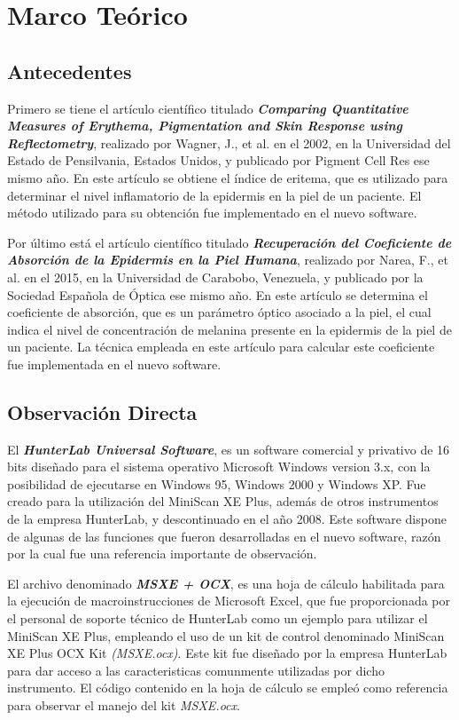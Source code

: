 \chapter{\label{cap:2}Marco Te\'{o}rico}

	\section{Antecedentes}	
			
			Primero se tiene el art\'{i}culo cient\'{i}fico titulado \textbf{\textit{Comparing Quantitative Measures of Erythema, Pigmentation and Skin Response using Reflectometry}}, realizado por Wagner, J., et al. en el 2002, en la Universidad del Estado de Pensilvania, Estados Unidos, y publicado por Pigment Cell Res ese mismo a\~{n}o. En este art\'{i}culo se obtiene el \'{i}ndice de eritema, que es utilizado para determinar el nivel inflamatorio de la epidermis en la piel de un paciente. El m\'{e}todo utilizado para su obtenci\'{o}n fue implementado en el nuevo software.
			
			Por	\'{u}ltimo est\'{a} el art\'{i}culo cient\'{i}fico titulado \textbf{\textit{Recuperaci\'{o}n del Coeficiente de Absorci\'{o}n de la Epidermis en la Piel Humana}}, realizado por Narea, F., et al. en el 2015, en la Universidad de Carabobo, Venezuela, y publicado por la Sociedad Espa\~{n}ola de \'{O}ptica ese mismo a\~{n}o. En este art\'{i}culo se determina el coeficiente de absorci\'{o}n, que es un par\'{a}metro \'{o}ptico asociado a la piel, el cual indica el nivel de concentraci\'{o}n de melanina presente en la epidermis de la piel de un paciente. La t\'{e}cnica empleada en este art\'{i}culo para calcular este coeficiente fue implementada en el nuevo software.

	\section{Observaci\'{o}n Directa}
		
			El \textbf{\textit{HunterLab Universal Software}}, es un software comercial y privativo de 16 bits dise\~{n}ado para el sistema operativo Microsoft Windows version 3.x, con la posibilidad de ejecutarse en Windows 95, Windows 2000 y Windows XP. Fue creado para la utilizaci\'{o}n del MiniScan XE Plus, adem\'{a}s de otros instrumentos de la empresa HunterLab, y descontinuado en el a\~{n}o 2008. Este software dispone de algunas de las funciones que fueron desarrolladas en el nuevo software, raz\'{o}n por la cual fue una referencia importante de observaci\'{o}n.

			El archivo denominado \textbf{\textit{MSXE + OCX}}, es una hoja de c\'{a}lculo habilitada para la ejecuci\'{o}n de macroinstrucciones de Microsoft Excel, que fue proporcionada por el personal de soporte t\'{e}cnico de HunterLab como un ejemplo para utilizar el MiniScan XE Plus, empleando el uso de un kit de control denominado MiniScan XE Plus OCX Kit \textit{(MSXE.ocx)}. Este kit fue dise\~{n}ado por la empresa HunterLab para dar acceso a las caracteristicas comunmente utilizadas por dicho instrumento. El c\'{o}digo contenido en la hoja de c\'{a}lculo se emple\'{o} como referencia para observar el manejo del kit \textit{MSXE.ocx}.

		